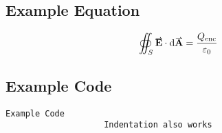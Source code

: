 \documentclass[a4paper, 12pt, english]{article}
\begin{document}
        \subsection{Example Equation}
            \label{app: example equation}

            \begin{equation}
                \oiint_S \vect{E} \cdot \d\vect{A} = \frac{Q_{\text{enc}}}{\varepsilon_0}
                \label{eq: Gauss Law}
            \end{equation}

        \subsection{Example Code}
            
            {
            \begin{lstlisting}[autogobble]
                Example Code
                    Indentation also works
            \end{lstlisting}
            \label{lst: code example}
            }

            
            
\end{document}
